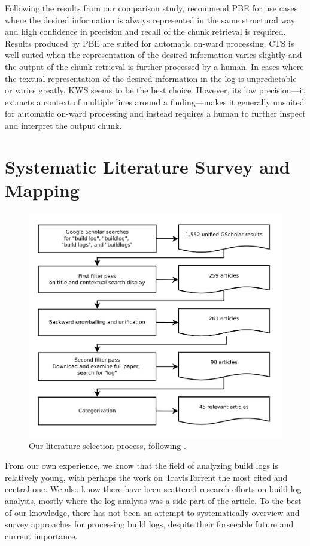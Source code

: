 Following the results from our comparison study,
recommend PBE for use cases where the desired information is always
represented in the same structural way and high confidence in precision
and recall of the chunk retrieval is required.
Results produced by PBE are suited for automatic on-ward processing.
CTS is well suited when the representation of the desired information
varies
slightly and the output of the chunk retrieval is further processed by
a human.
In cases where the textual representation of the desired information in
the log
is unpredictable or varies greatly, KWS seems to be the best choice.
However,
its low precision---it extracts a context of multiple lines around a
finding---makes it generally unsuited for automatic on-ward processing and
instead requires a human to further inspect and interpret the output
chunk.


\section{Systematic Literature Survey and Mapping}
\label{sec:survey}

\begin{figure}[htb]
	\centering
	\includegraphics[width=\columnwidth, clip]{img/lit_survey.pdf}
	\caption{Our literature selection process, following
	\cite{petersen2015guidelines}.}
	\label{fig:lit-survey}
\end{figure}

From our own experience, we know that the field of analyzing build
logs is relatively young, with perhaps the work on TravisTorrent the
most cited and central one.
We also know there have been scattered
research efforts on build log analysis, mostly where the
log analysis was a side-part of the article.
To the best of our
knowledge, there has not been an attempt to systematically overview
and survey approaches for processing build logs,
despite their forseeable future and current importance.


